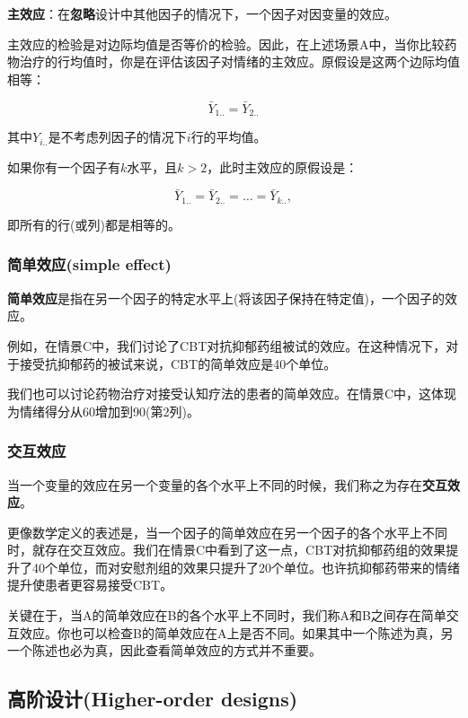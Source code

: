 \documentclass[
]{book}
\begin{document}
\textbf{主效应}：在\textbf{忽略}设计中其他因子的情况下，一个因子对因变量的效应。

主效应的检验是对边际均值是否等价的检验。因此，在上述场景A中，当你比较药物治疗的行均值时，你是在评估该因子对情绪的主效应。原假设是这两个边际均值相等：

\[\bar{Y}_{1..} = \bar{Y}_{2..}\]

其中\(Y_{i..}\)是不考虑列因子的情况下\(i\)行的平均值。

如果你有一个因子有\(k\)水平，且\(k > 2\)，此时主效应的原假设是：

\[\bar{Y}_{1..} = \bar{Y}_{2..} = \ldots = \bar{Y}_{k..},\]

即所有的行(或列)都是相等的。

\hypertarget{ux7b80ux5355ux6548ux5e94simple-effect}{%
\subsubsection{简单效应(simple effect)}\label{ux7b80ux5355ux6548ux5e94simple-effect}}

\textbf{简单效应}是指在另一个因子的特定水平上(将该因子保持在特定值)，一个因子的效应。

例如，在情景C中，我们讨论了CBT对抗抑郁药组被试的效应。在这种情况下，对于接受抗抑郁药的被试来说，CBT的简单效应是40个单位。

我们也可以讨论药物治疗对接受认知疗法的患者的简单效应。在情景C中，这体现为情绪得分从60增加到90(第2列)。

\hypertarget{ux4ea4ux4e92ux6548ux5e94-1}{%
\subsubsection{交互效应}\label{ux4ea4ux4e92ux6548ux5e94-1}}

当一个变量的效应在另一个变量的各个水平上不同的时候，我们称之为存在\textbf{交互效应}。

更像数学定义的表述是，当一个因子的简单效应在另一个因子的各个水平上不同时，就存在交互效应。我们在情景C中看到了这一点，CBT对抗抑郁药组的效果提升了40个单位，而对安慰剂组的效果只提升了20个单位。也许抗抑郁药带来的情绪提升使患者更容易接受CBT。

关键在于，当A的简单效应在B的各个水平上不同时，我们称A和B之间存在简单交互效应。你也可以检查B的简单效应在A上是否不同。如果其中一个陈述为真，另一个陈述也必为真，因此查看简单效应的方式并不重要。

\hypertarget{ux9ad8ux9636ux8bbeux8ba1higher-order-designs}{%
\subsection{高阶设计(Higher-order designs)}\label{ux9ad8ux9636ux8bbeux8ba1higher-order-designs}}
\end{document}
